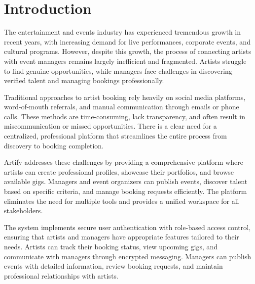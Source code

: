\documentclass[12pt,a4paper]{report}
\begin{document}
\clearpage

\listoftables

\clearpage


\newpage
{}
\pagestyle{maincontent}
\setcounter{chapter}{1}
\clearpage
\thispagestyle{empty}

\noindent
{}

\clearpage

\section{Introduction}
The entertainment and events industry has experienced tremendous growth in recent years, with increasing demand for live performances, corporate events, and cultural programs. However, despite this growth, the process of connecting artists with event managers remains largely inefficient and fragmented. Artists struggle to find genuine opportunities, while managers face challenges in discovering verified talent and managing bookings professionally.

Traditional approaches to artist booking rely heavily on social media platforms, word-of-mouth referrals, and manual communication through emails or phone calls. These methods are time-consuming, lack transparency, and often result in miscommunication or missed opportunities. There is a clear need for a centralized, professional platform that streamlines the entire process from discovery to booking completion.

Artify addresses these challenges by providing a comprehensive platform where artists can create professional profiles, showcase their portfolios, and browse available gigs. Managers and event organizers can publish events, discover talent based on specific criteria, and manage booking requests efficiently. The platform eliminates the need for multiple tools and provides a unified workspace for all stakeholders.

The system implements secure user authentication with role-based access control, ensuring that artists and managers have appropriate features tailored to their needs. Artists can track their booking status, view upcoming gigs, and communicate with managers through encrypted messaging. Managers can publish events with detailed information, review booking requests, and maintain professional relationships with artists.
\end{document}
